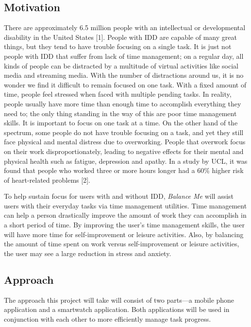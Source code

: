 \documentclass[12pt,letterpaper]{article}
\begin{document}
\subsection{Motivation}

There are approximately 6.5 million people with an intellectual or developmental disability in the United States [1]. People with IDD are capable of many great things, but they tend to have trouble focusing on a single task. It is just not people with IDD that suffer from lack of time management; on a regular day, all kinds of people can be distracted by a multitude of virtual activities like social media and streaming media. With the number of distractions around us, it is no wonder we find it difficult to remain focused on one task. With a fixed amount of time, people feel stressed when faced with multiple pending tasks. In reality, people usually have more time than enough time to accomplish everything they need to; the only thing standing in the way of this are poor time management skills. It is important to focus on one task at a time. On the other hand of the spectrum, some people do not have trouble focusing on a task, and yet they still face physical and mental distress due to overworking. People that overwork focus on their work disproportionately, leading to negative effects for their mental and physical health such as fatigue, depression and apathy. In a study by UCL, it was found that people who worked three or more hours longer had a 60\% higher risk of heart-related problems [2].

To help sustain focus for users with and without IDD, \textit{Balance Me} will assist users with their everyday tasks via time management utilities. Time management can help a person drastically improve the amount of work they can accomplish in a short period of time. By improving the user’s time management skills, the user will have more time for self-improvement or leisure activities. Also, by balancing the amount of time spent on work versus self-improvement or leisure activities, the user may see a large reduction in stress and anxiety.



\subsection{Approach}

The approach this project will take will consist of two parts---a mobile phone application and a smartwatch application. Both applications will be used in conjunction with each other to more efficiently manage task progress.
\end{document}

